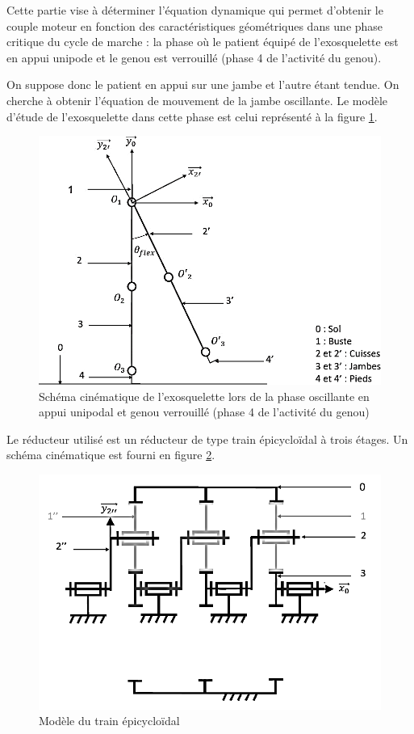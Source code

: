 Cette partie vise à déterminer l'équation dynamique qui permet d'obtenir le couple moteur en fonction des caractéristiques géométriques dans une phase critique du cycle de marche : la phase où le patient équipé de l'exosquelette est en appui unipode et le genou est verrouillé (phase 4 de
l'activité du genou).

On suppose donc le patient en appui sur une jambe et l'autre étant tendue. On cherche à obtenir l'équation de mouvement de la jambe oscillante. Le modèle d'étude de l'exosquelette dans cette phase est celui représenté à la figure \ref{fig11}.

\begin{figure}[ht!]
\begin{center}
 \includegraphics[width=0.4\linewidth]{img/fig11}
\end{center}
\caption{\label{fig11} Schéma cinématique de l'exosquelette lors de la phase oscillante en appui unipodal et genou verrouillé (phase 4 de l'activité du genou)}
\end{figure}

Le réducteur utilisé est un réducteur de type train épicycloïdal à trois étages. Un schéma cinématique est fourni en figure \ref{fig13}.

\begin{figure}[ht!]
\begin{center}
 \includegraphics[width=0.6\linewidth]{img/fig13}
\end{center}
\caption{\label{fig13} Modèle du train épicycloïdal}
\end{figure}

